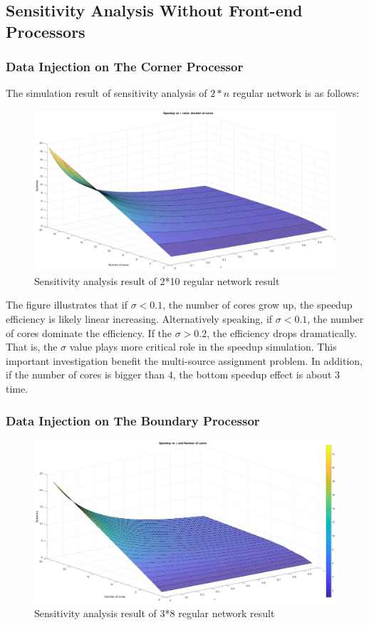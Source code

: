 \subsection{Sensitivity Analysis Without Front-end Processors}
\subsubsection{Data Injection on The Corner Processor}
The simulation result of sensitivity analysis of $2*n$ regular network  is as follows:
\begin{figure}[!ht]
\centering
\includegraphics[width=1\columnwidth]{figure/sa2t10c_no.eps}
\caption{Sensitivity analysis result of 2*10 regular network result}
\label{fig:sa2t10c_no}
\end{figure}

The figure illustrates that if $\sigma < 0.  1$, the number of cores grow up, the speedup efficiency is likely linear increasing.   Alternatively speaking, if $\sigma < 0.  1$, the number of cores dominate the efficiency.   If the $\sigma > 0.  2$, the efficiency drops dramatically.   That is, the $\sigma$ value plays more critical role in the speedup simulation.   This important investigation benefit the multi-source assignment problem.   In addition, if the number of cores is bigger than $4$, the bottom speedup effect is about $3$ time.   
\newpage

\subsubsection{Data Injection on The Boundary Processor}
\begin{figure}[!ht]
\centering
\includegraphics[width=1\columnwidth]{figure/sa3t8b_no.eps}
\caption{Sensitivity analysis result of 3*8 regular network result}
\label{fig:sa3t8b_no}
\end{figure}

